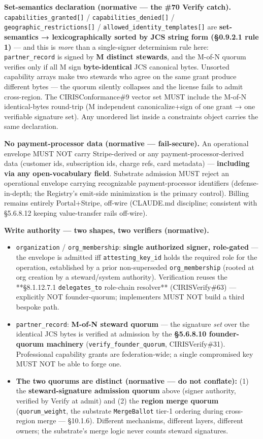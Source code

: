 \documentclass[10pt]{article}
\begin{document}
\textbf{Set-semantics declaration (normative — the \#70 Verify catch).} \texttt{capabilities\_granted[]} / \texttt{capabilities\_denied[]} / \texttt{geographic\_restrictions[]} / \texttt{allowed\_identity\_templates[]} are \textbf{set-semantics → lexicographically sorted by JCS string form (§0.9.2.1 rule 1)} — and this is \textit{more} than a single-signer determinism rule here: \texttt{partner\_record} is signed by \textbf{M distinct stewards}, and the M-of-N quorum verifies only if all M sign \textbf{byte-identical} JCS canonical bytes. Unsorted capability arrays make two stewards who agree on the same grant produce different bytes — the quorum silently collapses and the license fails to admit cross-region. The CIRISConformance\#9 vector set MUST include the M-of-N identical-bytes round-trip (M independent canonicalize+sign of one grant → one verifiable signature set). Any unordered list inside a constraints object carries the same declaration.


\textbf{No payment-processor data (normative — fail-secure).} An operational envelope MUST NOT carry Stripe-derived or any payment-processor-derived data (customer ids, subscription ids, charge refs, card metadata) — \textbf{including via any open-vocabulary field}. Substrate admission MUST reject an operational envelope carrying recognizable payment-processor identifiers (defense-in-depth; the Registry's emit-side minimization is the primary control). Billing remains entirely Portal+Stripe, off-wire (CLAUDE.md discipline; consistent with §5.6.8.12 keeping value-transfer rails off-wire).


\textbf{Write authority — two shapes, two verifiers (normative).}

\begin{itemize}\setlength\itemsep{0pt}
\item \texttt{organization} / \texttt{org\_membership}: \textbf{single authorized signer, role-gated} — the envelope is admitted iff \texttt{attesting\_key\_id} holds the required role for the operation, established by a prior non-superseded \texttt{org\_membership} (rooted at org creation by a steward/system authority). Verification reuses the **§8.1.12.7.1 \texttt{delegates\_to} role-chain resolver** (CIRISVerify\#63) — explicitly NOT founder-quorum; implementers MUST NOT build a third bespoke path.
\item \texttt{partner\_record}: \textbf{M-of-N steward quorum} — the signature \textit{set} over the identical JCS bytes is verified at admission by the \textbf{§5.6.8.10 founder-quorum machinery} (\texttt{verify\_founder\_quorum}, CIRISVerify\#31). Professional capability grants are federation-wide; a single compromised key MUST NOT be able to forge one.
\item \textbf{The two quorums are distinct (normative — do not conflate):} (1) the \textbf{steward-signature admission quorum} above (signer authority, verified by Verify at admit) and (2) the \textbf{region merge quorum} (\texttt{quorum\_weight}, the substrate \texttt{MergeBallot} tier-1 ordering during cross-region merge — §10.1.6). Different mechanisms, different layers, different owners; the substrate's merge logic never counts steward signatures.
\end{itemize}
\end{document}
